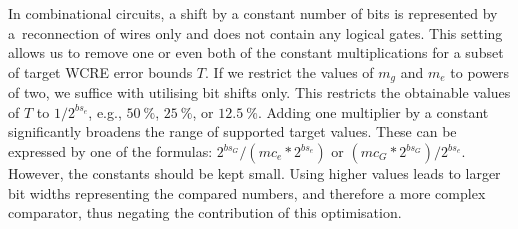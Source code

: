 \documentclass[runningheads]{llncs}
\begin{document}
In combinational circuits, a shift by a constant number of bits is represented
by a~reconnection of wires only and does not contain any logical gates. This
setting allows us to remove one or even both of the constant multiplications for
a subset of target WCRE error bounds $T$. 
%
If we restrict the values of $m_g$ and $m_e$ to powers of two, we suffice with
utilising bit shifts only. This restricts the obtainable values of $T$ to
$1/2^{bs_{e}}$, e.g., $50\ \%$, $25\ \%$, or $12.5\ \%$. Adding one multiplier
by a constant significantly broadens the range of supported target values. These
can be expressed by one of the formulas: $2^{bs_{G}} / (mc_{e} * 2^{bs_{e}})$ or
$(mc_{G} * 2^{bs_{G}}) / 2^{bs_{e}}$. However, the constants should be kept
small. Using higher values leads to larger bit widths representing the compared
numbers, and therefore a more complex comparator, thus negating the contribution
of this optimisation.


%
%
%


\end{document}
